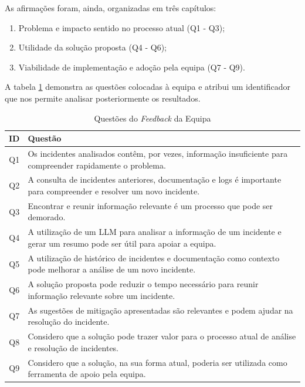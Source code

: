 		As afirmações foram, ainda, organizadas em três capítulos: 
		\begin{enumerate}
			\item Problema e impacto sentido no processo atual (Q1 - Q3);
			\item Utilidade da solução proposta (Q4 - Q6);
			\item Viabilidade de implementação e adoção pela equipa (Q7 - Q9).
		\end{enumerate}
		
		A tabela \ref{tab:questoes-feedback-equipa} demonstra as questões colocadas à equipa e atribui um identificador que nos permite analisar posteriormente os resultados.
		
		\begin{table}[H]
			\centering
			\small
			\begin{tabular}{cp{13cm}}
				\textbf{ID} & \textbf{Questão} \\
				\hline
				Q1 & Os incidentes analisados contêm, por vezes, informação insuficiente para compreender rapidamente o problema. \\
				\hline
				Q2 & A consulta de incidentes anteriores, documentação e logs é importante para compreender e resolver um novo incidente. \\
				\hline
				Q3 & Encontrar e reunir informação relevante é um processo que pode ser demorado. \\
				\hline
				Q4 & A utilização de um \gls{LLM} para analisar a informação de um incidente e gerar um resumo pode ser útil para apoiar a equipa. \\
				\hline
				Q5 & A utilização de histórico de incidentes e documentação como contexto pode melhorar a análise de um novo incidente. \\
				\hline
				Q6 & A solução proposta pode reduzir o tempo necessário para reunir informação relevante sobre um incidente. \\
				\hline
				Q7 & As sugestões de mitigação apresentadas são relevantes e podem ajudar na resolução do incidente. \\
				\hline
				Q8 & Considero que a solução pode trazer valor para o processo atual de análise e resolução de incidentes. \\
				\hline
				Q9 & Considero que a solução, na sua forma atual, poderia ser utilizada como ferramenta de apoio pela equipa. \\
				\hline
			\end{tabular}
			\caption[Questões do \textit{Feedback} da Equipa]{Questões do \textit{Feedback} da Equipa}
			\label{tab:questoes-feedback-equipa}
		\end{table}
		
